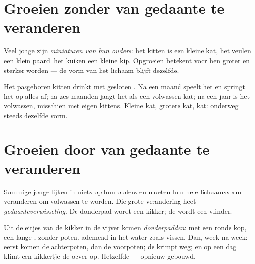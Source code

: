 \section{Groeien zonder van gedaante te veranderen}

\begin{definition}\label{def:g2:animals-grow-up:direct}
Veel jonge  zijn \emph{miniaturen van hun
ouders}: het kitten is een kleine kat,
het veulen een klein paard, het kuiken een kleine kip. Opgroeien
betekent voor hen groter en sterker worden --- de vorm van het lichaam
blijft dezelfde.
\end{definition}

\begin{example}\label{ex:g2:animals-grow-up:kitten}
Het pasgeboren kitten drinkt  met gesloten . Na een maand
speelt het en springt het op alles af; na zes maanden jaagt het als een
volwassen kat; na een jaar is het volwassen, misschien met eigen
kittens. Kleine kat, grotere kat, kat: onderweg steeds dezelfde vorm.
\end{example}

\section{Groeien door van gedaante te veranderen}

\begin{definition}[Gedaanteverwisseling]\label{def:g2:animals-grow-up:metamorphosis}
Sommige jonge  lijken in niets op hun ouders en moeten hun hele
lichaamsvorm veranderen om volwassen te worden. Die grote verandering
heet \emph{gedaanteverwisseling}. De
donderpad wordt een kikker; de  wordt een vlinder.
\end{definition}

\begin{example}\label{ex:g2:animals-grow-up:frog}
Uit de eitjes van de kikker in de vijver komen
\emph{donderpadden}: met een ronde kop, een lange
, zonder poten, ademend in het water zoals vissen. Dan, week na
week: eerst komen de achterpoten, dan de voorpoten; de  krimpt
weg; en op een dag klimt een kikkertje de oever op. Hetzelfde  ---
opnieuw gebouwd.
\end{example}

